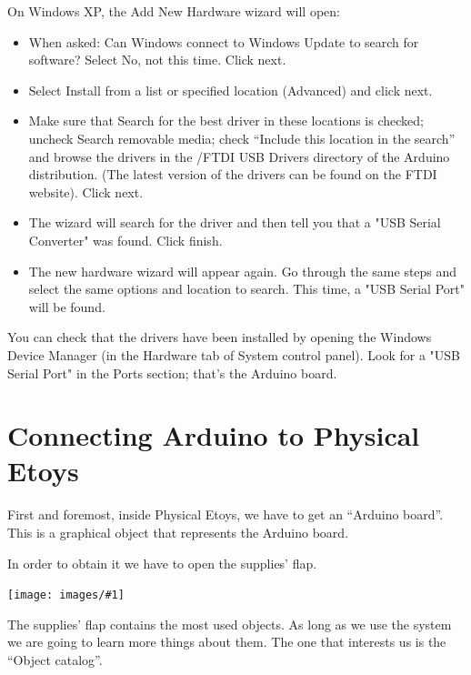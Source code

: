 \documentclass[a4paper,12pt]{article}
\newcommand{\screenshot}[1]
{
\begin{center}
	\texttt{[image: images/\#1]}
\end{center}
}
\begin{document}
On Windows XP, the Add New Hardware wizard will open:

\begin{itemize}
	
	\item When asked: Can Windows connect to Windows Update to search for
	software? Select No, not this time. Click next.

	\item Select Install from a list or specified location (Advanced) and click
	next.

	\item Make sure that Search for the best driver in these locations is
	checked; uncheck Search removable media; check “Include this location in
	the search” and browse the drivers in the /FTDI USB Drivers directory of
	the Arduino distribution. (The latest version of the drivers can be found
	on the FTDI website). Click next.

	\item The wizard will search for the driver and then tell you that a "USB
	Serial Converter" was found. Click finish.

	\item The new hardware wizard will appear again. Go through the same steps
	and select the same options and location to search. This time, a "USB
	Serial Port" will be found.

\end{itemize}

You can check that the drivers have been installed by opening the Windows
Device Manager (in the Hardware tab of System control panel). Look for a "USB
Serial Port" in the Ports section; that's the Arduino board.


\section{Connecting Arduino to Physical Etoys}

First and foremost, inside Physical Etoys, we have to get an “Arduino board”.
This is a graphical object that represents the Arduino board. 

In order to obtain it we have to open the supplies’ flap.

\screenshot{01.png}

The supplies’ flap contains the most used objects.  As long as we use the
system we are going to learn more things about them. The one that interests us
is the “Object catalog”.
\end{document}

